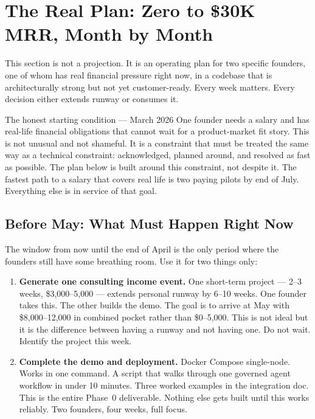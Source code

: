 \section*{The Real Plan: Zero to \$30K MRR, Month by Month}

This section is not a projection. It is an operating plan for two specific
founders, one of whom has real financial pressure right now, in a codebase
that is architecturally strong but not yet customer-ready. Every week
matters. Every decision either extends runway or consumes it.

\begin{warnbox}{The honest starting condition --- March 2026}
One founder needs a salary and has real-life financial obligations that
cannot wait for a product-market fit story. This is not unusual and not
shameful. It is a constraint that must be treated the same way as a
technical constraint: acknowledged, planned around, and resolved as fast
as possible. The plan below is built around this constraint, not despite
it. The fastest path to a salary that covers real life is two paying pilots
by end of July. Everything else is in service of that goal.
\end{warnbox}

\subsection*{Before May: What Must Happen Right Now}

The window from now until the end of April is the only period where the
founders still have some breathing room. Use it for two things only:

\begin{enumerate}[leftmargin=1.8em, itemsep=4pt]
  \item \textbf{Generate one consulting income event.}\;
    One short-term project --- 2--3 weeks, \$3,000--5,000 --- extends
    personal runway by 6--10 weeks. One founder takes this. The other
    builds the demo. The goal is to arrive at May with \$8,000--12,000
    in combined pocket rather than \$0--5,000. This is not ideal but it
    is the difference between having a runway and not having one.
    Do not wait. Identify the project this week.

  \item \textbf{Complete the demo and deployment.}\;
    Docker Compose single-node. Works in one command. A script that walks
    through one governed agent workflow in under 10 minutes. Three worked
    examples in the integration doc. This is the entire Phase~0 deliverable.
    Nothing else gets built until this works reliably. Two founders, four
    weeks, full focus.
\end{enumerate}

